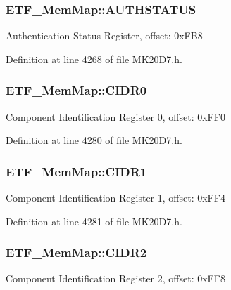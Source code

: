 \subsubsection[{\texorpdfstring{A\+U\+T\+H\+S\+T\+A\+T\+US}{AUTHSTATUS}}]{ E\+T\+F\+\_\+\+Mem\+Map\+::\+A\+U\+T\+H\+S\+T\+A\+T\+US}\hypertarget{struct_e_t_f___mem_map_ae403364ae54b1eb918a559349465a7a8}{}\label{struct_e_t_f___mem_map_ae403364ae54b1eb918a559349465a7a8}
Authentication Status Register, offset\+: 0x\+F\+B8 

Definition at line 4268 of file M\+K20\+D7.\+h.

\subsubsection[{\texorpdfstring{C\+I\+D\+R0}{CIDR0}}]{ E\+T\+F\+\_\+\+Mem\+Map\+::\+C\+I\+D\+R0}\hypertarget{struct_e_t_f___mem_map_aa11e0d070ab0917209b9dbd000f0dd3f}{}\label{struct_e_t_f___mem_map_aa11e0d070ab0917209b9dbd000f0dd3f}
Component Identification Register 0, offset\+: 0x\+F\+F0 

Definition at line 4280 of file M\+K20\+D7.\+h.

\subsubsection[{\texorpdfstring{C\+I\+D\+R1}{CIDR1}}]{ E\+T\+F\+\_\+\+Mem\+Map\+::\+C\+I\+D\+R1}\hypertarget{struct_e_t_f___mem_map_af7c4231d402d34bc78649e996d0595a5}{}\label{struct_e_t_f___mem_map_af7c4231d402d34bc78649e996d0595a5}
Component Identification Register 1, offset\+: 0x\+F\+F4 

Definition at line 4281 of file M\+K20\+D7.\+h.

\subsubsection[{\texorpdfstring{C\+I\+D\+R2}{CIDR2}}]{ E\+T\+F\+\_\+\+Mem\+Map\+::\+C\+I\+D\+R2}\hypertarget{struct_e_t_f___mem_map_aa4497a28e03196ee5a3d4c6cf8a7892f}{}\label{struct_e_t_f___mem_map_aa4497a28e03196ee5a3d4c6cf8a7892f}
Component Identification Register 2, offset\+: 0x\+F\+F8 

